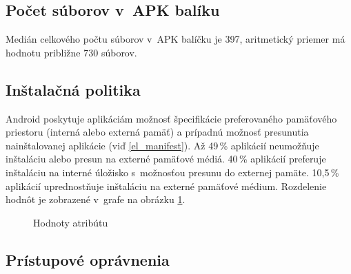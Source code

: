 \subsection{Počet súborov v~APK balíku}
Medián celkového počtu súborov v~APK balíčku je 397, aritmetický priemer má hodnotu približne 730 súborov.

\subsection{Inštalačná politika}
Android poskytuje aplikáciám možnosť špecifikácie preferovaného pamäťového priestoru (interná alebo externá pamäť) a prípadnú možnosť presunutia nainštalovanej aplikácie (viď \ref{el_manifest}). Až 49\,\% aplikácií neumožňuje inštaláciu alebo presun na externé pamäťové médiá.  40\,\% aplikácií preferuje inštaláciu na interné úložisko s~možnosťou presunu do externej pamäte. 10,5\,\% aplikácií uprednostňuje inštaláciu na externé pamäťové médium. Rozdelenie hodnôt je zobrazené v~grafe na obrázku \ref{installLocFig}.

\begin{figure}[htb]
\centering
{}
\caption{Hodnoty atribútu }
\label{installLocFig}
\end{figure}

\subsection{Prístupové oprávnenia}

